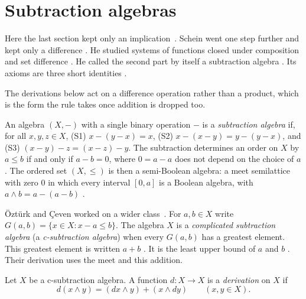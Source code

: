 \section{Subtraction algebras}\label{sec:other-systems:subtraction-algebras}

Here the last section kept only an implication~\cite[p.~510]{OzturkCeven2009}.
Schein went one step further and kept only a difference
\cite[p.~509]{OzturkCeven2009}. He studied systems of functions closed
under
composition and set difference \cite[p.~509]{OzturkCeven2009}.
He called the second part by itself a
subtraction algebra \cite[p.~509]{OzturkCeven2009}.
Its axioms are three short identities
\cite[p.~510]{OzturkCeven2009}.

The derivations below act on a difference operation rather than a product,
which is the form the rule takes once addition is dropped too.

\begin{definition}\label{def:other:subtraction-algebra}
An algebra $(X, -)$ with a single binary operation $-$ is a
\emph{subtraction algebra} if, for all $x, y, z \in X$,
\textup{(S1)} $x - (y - x) = x$,
\textup{(S2)} $x - (x - y) = y - (y - x)$, and
\textup{(S3)} $(x - y) - z = (x - z) - y$.
The subtraction determines an order on $X$ by $a \le b$ if and only if
$a - b = 0$, where $0 = a - a$ does not depend on the choice of $a$. The
ordered set $(X, \le)$ is then a semi-Boolean algebra: a meet semilattice
with zero $0$ in which every interval $[0, a]$ is a Boolean algebra, with
$a \wedge b = a - (a - b)$ \cite[p.~510]{OzturkCeven2009}.
\end{definition}

{\"O}zt{\"u}rk and {\c{C}}even worked on a wider class~\cite[Definition~2.3, p.~510]{OzturkCeven2009}. For $a, b \in X$ write
$G(a, b) = \{x \in X : x - a \le b\}$. The algebra $X$ is a \emph{complicated
subtraction algebra} \cite[Definition~2.3, p.~510]{OzturkCeven2009} (a
\emph{c-subtraction algebra}) when every $G(a, b)$ has a greatest element. This
greatest element is written $a + b$ \cite[Definition~2.3,
p.~510]{OzturkCeven2009}. It is the least upper bound of $a$ and $b$
\cite[Definition~2.3, p.~510]{OzturkCeven2009}. Their derivation uses the meet
and this addition.

\begin{definition}\label{def:other:subtraction-derivation}
Let $X$ be a c-subtraction algebra. A function $d \colon X \to X$ is a
\emph{derivation} on $X$ if
\[
d(x \wedge y) = (dx \wedge y) + (x \wedge dy)
\qquad (x, y \in X).
\]
\end{definition}


